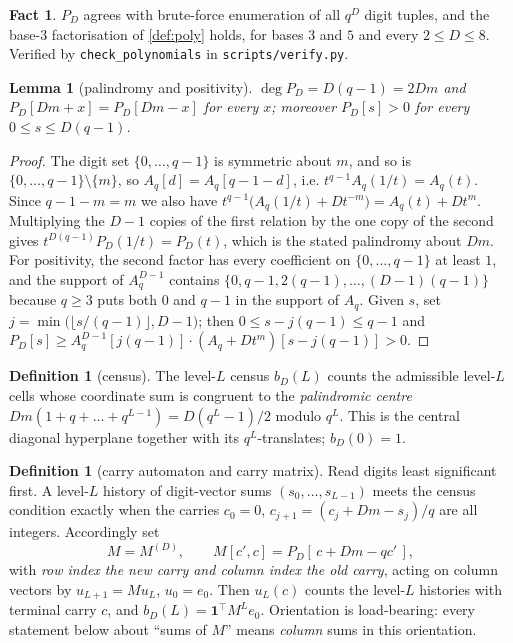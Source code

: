 \documentclass[11pt]{amsart}
\newtheorem{lemma}[theorem]{Lemma}
\theoremstyle{definition}
\newtheorem{definition}[theorem]{Definition}
\newtheorem{fact}[theorem]{Fact}
\theoremstyle{remark}
\begin{document}
\begin{fact}
\label{fact:poly}
$P_D$ agrees with brute-force enumeration of all $q^D$ digit tuples, and the base-$3$ factorisation of \cref{def:poly} holds, for bases $3$ and $5$ and every $2 \le D \le 8$. Verified by \texttt{check\_polynomials} in \texttt{scripts/verify.py}.
\end{fact}

\begin{lemma}[palindromy and positivity]
\label{lem:palin}
$\deg P_D = D(q-1) = 2Dm$ and $P_D[Dm + x] = P_D[Dm - x]$ for every $x$; moreover $P_D[s] > 0$ for every $0 \le s \le D(q-1)$.
\end{lemma}

\begin{proof}
The digit set $\{0,\dots,q-1\}$ is symmetric about $m$, and so is $\{0,\dots,q-1\}\setminus\{m\}$, so $A_q[d] = A_q[q-1-d]$, i.e. $t^{q-1}A_q(1/t) = A_q(t)$. Since $q-1-m = m$ we also have $t^{q-1}\bigl(A_q(1/t) + D t^{-m}\bigr) = A_q(t) + D t^m$. Multiplying the $D-1$ copies of the first relation by the one copy of the second gives $t^{D(q-1)}P_D(1/t) = P_D(t)$, which is the stated palindromy about $Dm$. For positivity, the second factor has every coefficient on $\{0,\dots,q-1\}$ at least $1$, and the support of $A_q^{D-1}$ contains $\{0, q-1, 2(q-1),\dots,(D-1)(q-1)\}$ because $q \ge 3$ puts both $0$ and $q-1$ in the support of $A_q$. Given $s$, set $j = \min\bigl(\lfloor s/(q-1)\rfloor, D-1\bigr)$; then $0 \le s - j(q-1) \le q-1$ and $P_D[s] \ge A_q^{D-1}[j(q-1)] \cdot (A_q + Dt^m)[s-j(q-1)] > 0$.
\end{proof}

\begin{definition}[census]
\label{def:census}
The level-$L$ census $b_D(L)$ counts the admissible level-$L$ cells whose coordinate sum is congruent to the \emph{palindromic centre} $Dm(1 + q + \dots + q^{L-1}) = D(q^L-1)/2$ modulo $q^L$. This is the central diagonal hyperplane together with its $q^L$-translates; $b_D(0) = 1$.
\end{definition}

\begin{definition}[carry automaton and carry matrix]
\label{def:carry}
Read digits least significant first. A level-$L$ history of digit-vector sums $(s_0,\dots,s_{L-1})$ meets the census condition exactly when the carries $c_0 = 0$, $c_{j+1} = (c_j + Dm - s_j)/q$ are all integers. Accordingly set
\[
  M = M^{(D)}, \qquad M[c',c] = P_D[\,c + Dm - q c'\,],
\]
with \emph{row index the new carry and column index the old carry}, acting on column vectors by $u_{L+1} = M u_L$, $u_0 = e_0$. Then $u_L(c)$ counts the level-$L$ histories with terminal carry $c$, and $b_D(L) = \mathbf{1}^{\top} M^L e_0$. Orientation is load-bearing: every statement below about ``sums of $M$'' means \emph{column} sums in this orientation.
\end{definition}
\end{document}
